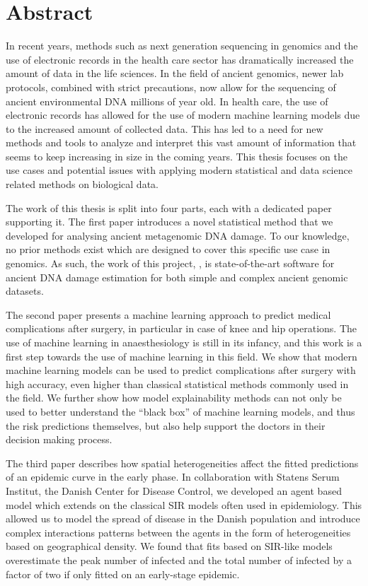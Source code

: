 \chapter{Abstract}


In recent years, methods such as next generation sequencing in genomics and the use of electronic records in the health care sector has dramatically increased the amount of data in the life sciences. In the field of ancient genomics, newer lab protocols, combined with strict precautions, now allow for the sequencing of ancient environmental DNA millions of year old. In health care, the use of electronic records has allowed for the use of modern machine learning models due to the increased amount of collected data.
This has led to a need for new methods and tools to analyze and interpret this vast amount of information that seems to keep increasing in size in the coming years. This thesis focuses on the use cases and potential issues with applying modern statistical and data science related methods on biological data.

The work of this thesis is split into four parts, each with a dedicated paper supporting it. The first paper introduces a novel statistical method that we developed for analysing ancient metagenomic DNA damage. To our knowledge, no prior methods exist which are designed to cover this specific use case in genomics. As such, the work of this project, \metaDMG, is state-of-the-art software for ancient DNA damage estimation for both simple and complex ancient genomic datasets.

The second paper presents a machine learning approach to predict medical complications after surgery, in particular in case of knee and hip operations. The use of machine learning in anaesthesiology is still in its infancy, and this work is a first step towards the use of machine learning in this field. We show that modern machine learning models can be used to predict complications after surgery with high accuracy, even higher than classical statistical methods commonly used in the field.  We further show how model explainability methods can not only be used to better understand the ``black box'' of machine learning models, and thus the risk predictions themselves, but also help support the doctors in their decision making process.

The third paper describes how spatial heterogeneities affect the fitted predictions of an epidemic curve in the early phase. In collaboration with Statens Serum Institut, the Danish Center for Disease Control, we developed an agent based model which extends on the classical SIR models often used in epidemiology. This allowed us to model the spread of disease in the Danish population and introduce complex interactions patterns between the agents in the form of heterogeneities based on geographical density. We found that fits based on SIR-like models overestimate the peak number of infected and the total number of infected by a factor of two if only fitted on an early-stage epidemic.

